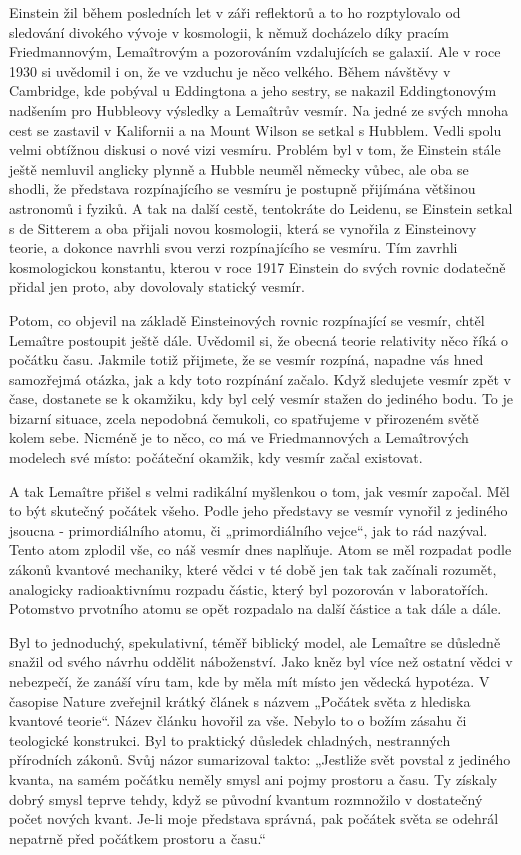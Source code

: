   Einstein žil během posledních let v záři reflektorů a to ho rozptylovalo od sledování divokého
  vývoje v kosmologii, k němuž docházelo díky pracím Friedmannovým, Lemaîtrovým a pozorováním
  vzdalujících se galaxií. Ale v roce 1930 si uvědomil i on, že ve vzduchu je něco velkého. Během
  návštěvy v Cambridge, kde pobýval u Eddingtona a jeho sestry, se nakazil Eddingtonovým nadšením
  pro Hubbleovy výsledky a Lemaîtrův vesmír. Na jedné ze svých mnoha cest se zastavil v Kalifornii a
  na Mount Wilson se setkal s Hubblem. Vedli spolu velmi obtížnou diskusi o nové vizi vesmíru.
  Problém byl v tom, že Einstein stále ještě nemluvil anglicky plynně a Hubble neuměl německy vůbec,
  ale oba se shodli, že představa rozpínajícího se vesmíru je postupně přijímána většinou astronomů
  i fyziků. A tak na další cestě, tentokráte do Leidenu, se Einstein setkal s de Sitterem a oba
  přijali novou kosmologii, která se vynořila z Einsteinovy teorie, a dokonce navrhli svou verzi
  rozpínajícího se vesmíru. Tím zavrhli kosmologickou konstantu, kterou v roce 1917 Einstein do
  svých rovnic dodatečně přidal jen proto, aby dovolovaly statický vesmír. 
  
  Potom, co objevil na základě Einsteinových rovnic rozpínající se vesmír, chtěl Lemaître postoupit
  ještě dále. Uvědomil si, že obecná teorie relativity něco říká o počátku času. Jakmile totiž
  přijmete, že se vesmír rozpíná, napadne vás hned samozřejmá otázka, jak a kdy toto rozpínání
  začalo. Když sledujete vesmír zpět v čase, dostanete se k okamžiku, kdy byl celý vesmír stažen do
  jediného bodu. To je bizarní situace, zcela nepodobná čemukoli, co spatřujeme v přirozeném světě
  kolem sebe. Nicméně je to něco, co má ve Friedmannových a Lemaîtrových modelech své místo:
  počáteční okamžik, kdy vesmír začal existovat. 
  
  A tak Lemaître přišel s velmi radikální myšlenkou o tom, jak vesmír započal. Měl to být skutečný
  počátek všeho. Podle jeho představy se vesmír vynořil z jediného jsoucna - primordiálního atomu,
  či „primordiálního vejce“, jak to rád nazýval. Tento atom zplodil vše, co náš vesmír dnes
  naplňuje. Atom se měl rozpadat podle zákonů kvantové mechaniky, které vědci v té době jen tak tak
  začínali rozumět, analogicky radioaktivnímu rozpadu částic, který byl pozorován v laboratořích.
  Potomstvo prvotního atomu se opět rozpadalo na další částice a tak dále a dále. 
  
  Byl to jednoduchý, spekulativní, téměř biblický model, ale Lemaître se důsledně snažil od svého
  návrhu oddělit náboženství. Jako kněz byl více než ostatní vědci v nebezpečí, že zanáší víru tam,
  kde by měla mít místo jen vědecká hypotéza. V časopise Nature zveřejnil krátký článek s názvem
  „Počátek světa z hlediska kvantové teorie“. Název článku hovořil za vše. Nebylo to o božím zásahu
  či teologické konstrukci. Byl to praktický důsledek chladných, nestranných přírodních zákonů. Svůj
  názor sumarizoval takto: „Jestliže svět povstal z jediného kvanta, na samém počátku neměly smysl
  ani pojmy prostoru a času. Ty získaly dobrý smysl teprve tehdy, když se původní kvantum rozmnožilo
  v dostatečný počet nových kvant. Je-li moje představa správná, pak počátek světa se odehrál
  nepatrně před počátkem prostoru a času.“
  
